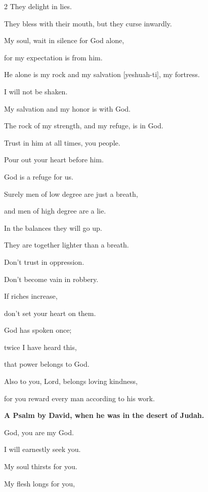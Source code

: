 \begin{multicols}{2}
	They delight in lies.
	
	They bless with their mouth, but they curse inwardly.
	
	\vspace{\baselineskip}	
	
	
	\myverse{}My soul, wait in silence for God alone,
	
	for my expectation is from him.
	
	
	\myverse{}He alone is my rock and my salvation [yeshuah-ti], my fortress.
	
	I will not be shaken.
	
	
	\myverse{}My salvation and my honor is with God.
	
	The rock of my strength, and my refuge, is in God.
	
	
	\myverse{}Trust in him at all times, you people.
	
	Pour out your heart before him.
	
	God is a refuge for us.
	
	\vspace{\baselineskip}		
	
	\myverse{}Surely men of low degree are just a breath,
	
	and men of high degree are a lie.
	
	In the balances they will go up.
	
	They are together lighter than a breath.
	
	
	\myverse{}Don’t trust in oppression.
	
	Don’t become vain in robbery.
	
	If riches increase,
	
	don’t set your heart on them.
	
	
	\myverse{}God has spoken once;
	
	twice I have heard this,
	
	that power belongs to God.
	
	
	\myverse{}Also to you, Lord, belongs loving kindness,
	
	for you reward every man according to his work.
	
	
	\mychapter{}\textbf{A Psalm by David, when he was in the desert of Judah.}
	
	\myverse*{}God, you are my God.
	
	I will earnestly seek you.
	
	My soul thirsts for you.
	
	My flesh longs for you,
	

\end{multicols}
